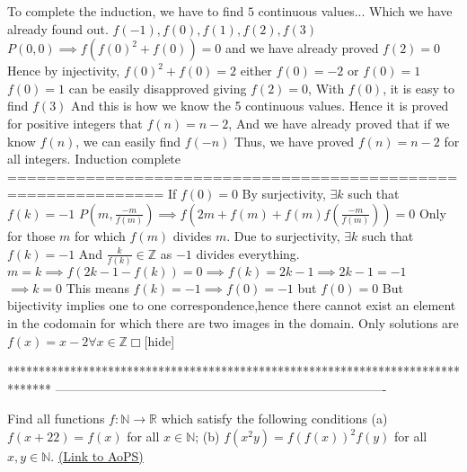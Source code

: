 \begin{solution}
To complete the induction, we have to find $5$ continuous values...
Which we have already found out. $f(-1),f(0),f(1),f(2),f(3)$
$P(0,0)\implies f(f(0)^2+f(0))=0$ and we have already proved $f(2)=0$
Hence by injectivity, $f(0)^2+f(0)=2$ either $f(0)=-2$ or $f(0)=1$
$f(0)= 1$ can be easily disapproved giving $f(2)=0$,
With $f(0)$, it is easy to find $f(3)$
And this is how we know the 5 continuous values.
Hence it is proved for positive integers that $f(n)=n-2$,
And we have already proved that if we know $f(n)$, we can easily find $f(-n)$
Thus, we have proved $f(n)=n-2$ for all integers.
Induction complete
==============================================================
If $f(0)=0$
By surjectivity,
$\exists k$ such that $f(k)=-1$
$P\left(m,\frac{-m}{f(m)}\right)\implies f\left(2m+f(m)+f(m)f\left(\frac{-m}{f(m)}\right)\right)=0$
Only for those $m$ for which $f(m)$ divides $m$.
Due to surjectivity, $\exists k$ such that$ f(k)=-1$
And $\frac{k}{f(k)}\in\mathbb{Z}$ as $-1$ divides everything.
$m=k\implies f(2k-1-f(k))=0\implies f(k)=2k-1\implies 2k-1=-1$
$\implies k=0$
This means $f(k)=-1\implies f(0)=-1$ but $f(0)=0$
But bijectivity implies one to one correspondence,hence there cannot exist an element in the codomain for which
there are two images in the domain.
Only solutions are $f(x)=x-2\forall x\in\mathbb{Z}\Box$[\/hide]
\end{solution}
*******************************************************************************
-------------------------------------------------------------------------------

\begin{problem}
	Find all functions $f:\mathbb{N}\rightarrow \mathbb{R}$ which satisfy the following conditions
(a) $f(x+22)=f(x)$ for all $x\in \mathbb{N}$;
(b) $f(x^2y)=f(f(x))^2 f(y)$ for all $x,y \in \mathbb{N}$.
	\flushright \href{https://artofproblemsolving.com/community/c6h582503}{(Link to AoPS)}
\end{problem}



